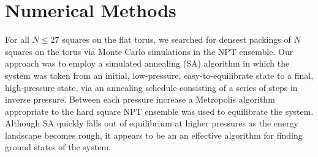 \documentclass[preprint,aps]{revtex4}
\begin{document}
\section{Numerical Methods}
\label{sec:numerical}

For all $N \leq 27$ squares on the flat torus, we searched for densest packings of $N$ squares on the torus via Monte Carlo simulations in the NPT ensemble.  Our approach was to employ a simulated annealing (SA) algorithm in which the system was taken from an initial, low-pressure, easy-to-equilibrate state to a final, high-pressure state, via an annealing schedule consisting of a series of steps in inverse pressure.  Between each pressure increase a Metropolis algorithm appropriate to the hard square NPT ensemble was used to equilibrate the system.  Although SA quickly falls out of equilibrium at higher pressures as the energy landscape becomes rough, it appears to be an an effective algorithm for finding ground states of the system.  

\end{document}
